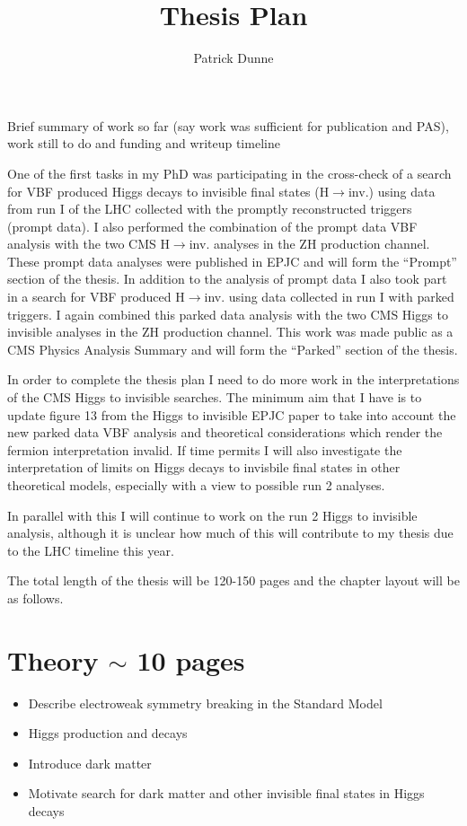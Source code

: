 \documentclass[12pt]{article}
\begin{document}
\title{Thesis Plan}
\author{Patrick Dunne}

\maketitle
Brief summary of work so far (say work was sufficient for publication and PAS), work still to do and funding and writeup timeline


One of the first tasks in my PhD was participating in the cross-check of a search for VBF produced Higgs decays to invisible final states (H$\rightarrow$inv.) using data from run I of the LHC collected with the promptly reconstructed triggers (prompt data). I also performed the combination of the prompt data VBF analysis with the two CMS H$\rightarrow$inv. analyses in the ZH production channel. These prompt data analyses were published in EPJC and will form the “Prompt” section of the thesis. In addition to the analysis of prompt data I also took part in a search for VBF produced H$\rightarrow$inv. using data collected in run I with parked triggers. I again combined this parked data analysis with the two CMS Higgs to invisible analyses in the ZH production channel. This work was made public as a CMS Physics Analysis Summary and will form the “Parked” section of the thesis.

In order to complete the thesis plan I need to do more work in the interpretations of the CMS Higgs to invisible searches. The minimum aim that I have is to update figure 13 from the Higgs to invisible EPJC paper to take into account the new parked data VBF analysis and theoretical considerations which render the fermion interpretation invalid. If time permits I will also investigate the interpretation of limits on Higgs decays to invisbile final states in other theoretical models, especially with a view to possible run 2 analyses.

In parallel with this I will continue to work on the run 2 Higgs to invisible analysis, although it is unclear how much of this will contribute to my thesis due to the LHC timeline this year.


The total length of the thesis will be 120-150 pages and the chapter layout will be as follows.

\section{Theory $\sim$ 10 pages}
\begin{itemize}
\label{sec:theory}
\item Describe electroweak symmetry breaking in the Standard Model
\item Higgs production and decays
\item Introduce dark matter
\item Motivate search for dark matter and other invisible final states in Higgs decays
\end{itemize}
\end{document}
